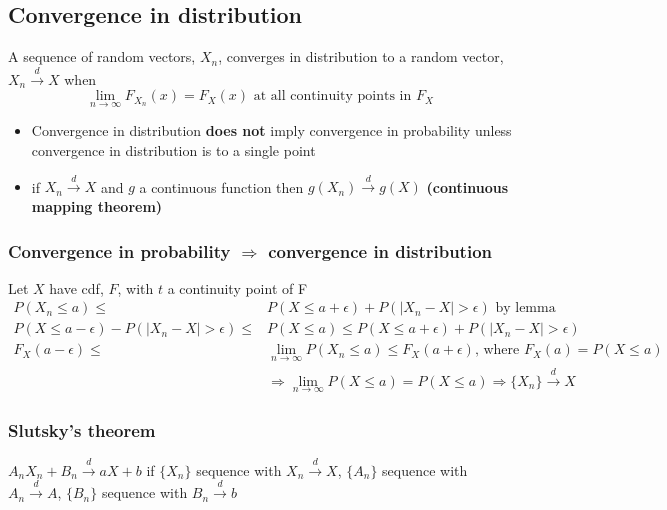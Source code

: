 \documentclass{article}
\newcommand{\abs}[1]{\lvert#1\rvert}
\begin{document}
\subsection{Convergence in distribution}
A sequence of random vectors, $X_n$, converges in distribution to a random vector, $X_n \overset{d}{\longrightarrow} X$ when
\begin{equation*}
    \lim_{n\longrightarrow \infty} F_{X_n}(x) = F_X(x) \textrm{ at all continuity points in } F_X
\end{equation*}

\begin{itemize}
    \item Convergence in distribution \textbf{does not} imply convergence in probability unless convergence in distribution is to a single point
    \item if $X_n \overset{d}{\longrightarrow} X$ and $g$ a continuous function then $g(X_n) \overset{d}{\longrightarrow} g(X)$ \textbf{(continuous mapping theorem)}
\end{itemize}

\subsubsection{Convergence in probability $\Longrightarrow$ convergence in distribution}
Let $X$ have cdf, $F$, with $t$ a continuity point of F
\begin{align*}
    P(X_n \leq a) \leq& P(X \leq a + \epsilon) + P( \abs{X_n - X} > \epsilon) \textrm{ by lemma}\\
    P(X \leq a - \epsilon) - P(\abs{X_n - X} > \epsilon) \leq& P(X \leq a) \leq P(X \leq a + \epsilon) + P(\abs{X_n - X} > \epsilon)\\
    F_X(a - \epsilon) \leq& \lim_{n\rightarrow \infty} P(X_n \leq a) \leq F_X(a + \epsilon) \textrm{, where } F_X(a) = P(X \leq a)\\
    &\Longrightarrow \lim_{n \rightarrow \infty} P(X \leq a) = P(X \leq a) \Longrightarrow \{X_n \} \overset{d}{\longrightarrow} X
\end{align*}

\subsubsection{Slutsky's theorem}
$A_nX_n + B_n \overset{d}{\rightarrow} aX + b$ if $\{X_n\}$ sequence with $X_n \overset{d}{\rightarrow} X$,  $\{A_n\}$ sequence with $A_n \overset{d}{\rightarrow} A$,   $\{B_n\}$ sequence with $B_n \overset{d}{\rightarrow} b$
\end{document}
